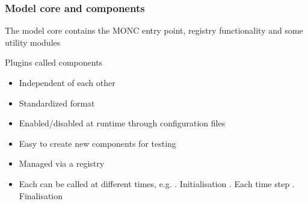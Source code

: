 \documentclass{beamer}
\begin{document}
\begin{frame}
\frametitle{Model core and components}

The model core  contains the MONC entry point, registry functionality and some utility modules

Plugins called components
\begin{itemize}
\item Independent of each other
\item Standardized format
\item Enabled/disabled at runtime through configuration files
\item Easy to create new components for testing
\item Managed via a registry
\item Each can be called at different times, e.g. . Initialisation . Each time step . Finalisation \newline
\end{itemize}
\end{frame}
\end{document}
